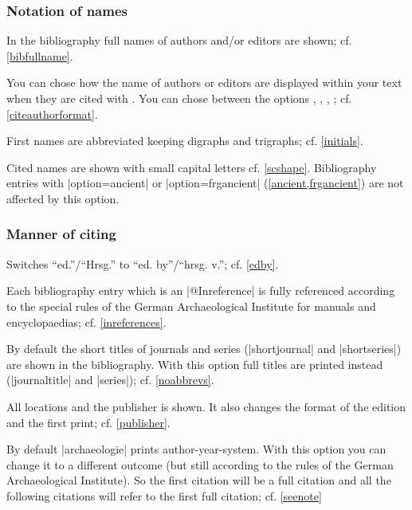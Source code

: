 \documentclass[a4paper,
10pt,
greek,
french,
spanish,
italian,
ngerman,
english
]{ltxdoc}
\begin{document}
\subsubsection{Notation of names}
In the bibliography full names of authors and/or editors are shown; cf. \cref{bibfullname}.

You can chose how the name of authors or editors are displayed within your text when they are cited with .
You can chose between the options , , , ; 
cf. \cref{citeauthorformat}.



First names are abbreviated keeping digraphs and trigraphs; cf. \cref{initials}.

Cited names are shown with small capital letters cf. \cref{scshape}.
Bibliography entries with |option={ancient}| or |option={frgancient}| (\cref{ancient,frgancient}) are not affected by this option.

\subsubsection{Manner of citing}

Switches \enquote{ed.}/\enquote{Hrsg.} to \enquote{ed. by}/\enquote{hrsg. v.}; cf. \cref{edby}.

Each bibliography entry which is an |@Inreference| is fully referenced according to the special rules of the 
German Archaeological Institute for manuals and encyclopaedias; cf. \cref{inreferences}.

By default the short titles of journals and series (|shortjournal| and |shortseries|) are shown in the bibliography.
With this option full titles are printed instead (|journaltitle| and |series|); cf. \cref{noabbrevs}.

All locations and the publisher is shown. 
It also changes the format of the edition and the first print; cf. \cref{publisher}.

By default |archaeologie| prints author-year-system. 
With this option you can change it to a different outcome (but still according to the rules of the German Archaeological Institute). 
So the first citation will be a full citation and all the following citations will refer to the first full citation; cf. \cref{seenote}
\end{document}
